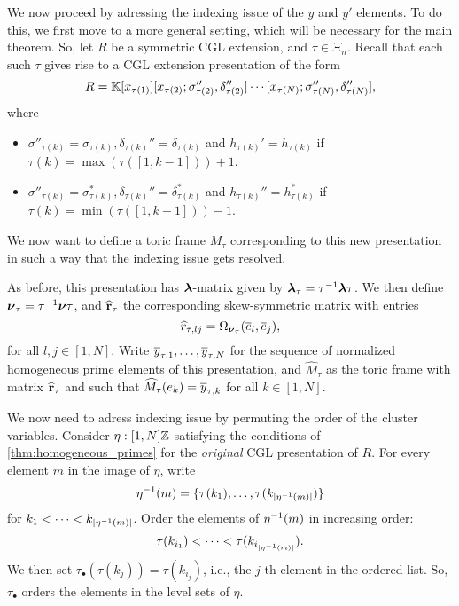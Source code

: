 We now proceed by adressing the indexing issue of the $y$ and $y'$ elements. To do
this, we first move to a more general setting, which will be necessary for the main
theorem. So, let $R$ be a symmetric CGL extension, and $\tau \in \Xi_n$. Recall that
each such $\tau$ gives rise to a CGL extension presentation of the form
\begin{equation*}
	R = \mathbb{K}[x_{\tau(1)}][x_{\tau(2)}; \sigma_{\tau(2)}'', \delta_{\tau(2)}''] \cdots [x_{\tau(N)}; \sigma_{\tau(N)}'', \delta_{\tau(N)}''],
\end{equation*}
%
where
\begin{itemize}
	\item $\sigma''_{\tau(k)} = \sigma_{\tau(k)}, \delta_{\tau(k)}'' = \delta_{\tau(k)}$
	      and $h_{\tau(k)}' = h_{\tau(k)}$ if $\tau(k) = \max(\tau([1,k-1])) + 1$.
	\item $\sigma''_{\tau(k)} = \sigma^*_{\tau(k)}, \delta_{\tau(k)}'' = \delta^*_{\tau(k)}$ and
	      $h_{\tau(k)}'' = h_{\tau(k)}^*$ if $\tau(k) = \min(\tau([1,k-1])) - 1$.
\end{itemize}

We now want to define a toric frame $M_\tau$ corresponding to this new presentation in
such a way that the indexing issue gets resolved.

As before, this presentation has $\boldsymbol{\lambda}$-matrix given by $\boldsymbol{\lambda}_\tau = \tau^{-1} \boldsymbol{\lambda}
	\tau$. We then define $\boldsymbol{\nu}_\tau = \tau^{-1} \boldsymbol{\nu} \tau$, and $\widehat{\mathbf{r}}_\tau$ the
corresponding skew-symmetric matrix with entries
\begin{equation*}
	\widehat{r}_{\tau, lj} = \Omega_{\boldsymbol{\nu}_\tau}(\overline{e}_l, \overline{e}_j),
\end{equation*}
%
for all $l, j \in [1, N]$.	Write $\overline{y}_{\tau, 1}, \dots, \overline{y}_{\tau, N}$ for the
sequence of normalized homogeneous prime elements of this presentation, and
$\widehat{M}_\tau$ as the toric frame with matrix $\widehat{\mathbf{r}}_\tau$ and such that
$\widehat{M}_\tau (e_k) = \overline{y}_{\tau, k}$ for all $k \in [1, N]$.

We now need to adress indexing issue by permuting the order of the cluster variables.
Consider $\eta : [1, N] \mathbb{Z}$ satisfying the conditions of
\cref{thm:homogeneous_primes} for the \emph{original} CGL presentation of $R$. For
every element $m$ in the image of $\eta$, write
\begin{equation*}
	\eta^{-1}(m) = \{\tau(k_1), \dots, \tau(k_{|\eta^{-1}(m)|})\}
\end{equation*}
for $k_1 < \cdots < k_{|\eta^{-1}(m)|}$. Order the elements of $\eta^{-1}(m)$ in increasing order:
\begin{equation*}
	\tau(k_{i_1}) < \cdots < \tau(k_{i_{|\eta^{-1}(m)|}}).
\end{equation*}
We then set $\tau_\bullet(\tau(k_j)) = \tau(k_{i_j})$, i.e., the $j$-th element in the ordered list. So, $\tau_\bullet$ orders the elements in the level sets of $\eta$.

